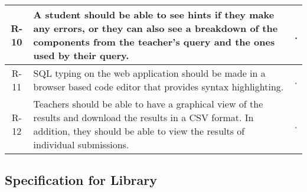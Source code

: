 \begin{tabularx}{\textwidth}{|c|Y|Y|}
  R-10 & A  student  should  be  able  to  see  hints  if  they  make  any  errors,  or  they  can  also  see  a breakdown of the components from the teacher’s query and the ones used by their query. & . \\\hline
  R-11 & SQL typing on the web application should be made in a browser based code editor that provides syntax highlighting. & . \\\hline
  R-12 & Teachers should be able to have a graphical view of the results and download the results in  a CSV format.   In  addition,  they  should  be  able  to  view  the  results  of  individual submissions. & . \\\hline
\end{tabularx}

\subsection{Specification for Library}

